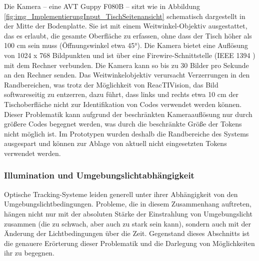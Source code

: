 Die Kamera -- eine AVT Guppy F080B \citep{AVT08}  -- sitzt wie in Abbildung \ref{fig:img_ImplementierungInput_TischSeitenansicht} schematisch dargestellt in der Mitte der Bodenplatte. Sie ist mit einem Weitwinkel-Objektiv ausgestattet, das es erlaubt, die gesamte Oberfläche zu erfassen, ohne dass der Tisch höher als 100 cm sein muss (Öffnungswinkel etwa 45°). Die Kamera bietet eine Auflösung von 1024 x 768 Bildpunkten und ist über eine Firewire-Schnittstelle (IEEE 1394 \citep{Bloks96}) mit dem Rechner verbunden. Die Kamera kann so bis zu 30 Bilder pro Sekunde an den Rechner senden. Das Weitwinkelobjektiv verursacht Verzerrungen in den Randbereichen, was trotz der Möglichkeit von ReacTIVision, das Bild softwareseitig zu entzerren, dazu führt, dass links und rechts etwa 10 cm der Tischoberfläche nicht zur Identifikation von Codes verwendet werden können. Dieser Problematik kann aufgrund der beschränkten Kameraauflösung nur durch größere Codes begegnet werden, was durch die beschränkte Größe der Tokens nicht möglich ist. Im Prototypen wurden deshalb die Randbereiche des Systems ausgespart und können zur Ablage von aktuell nicht eingesetzten Tokens verwendet werden. 

\subsubsection{Illumination und Umgebungslichtabhängigkeit} %
\label{sub:illumination_und_umgebungslichtabhängigkeit}

Optische Tracking-Systeme leiden generell unter ihrer Abhängigkeit von den Umgebungslichtbedingungen. Probleme, die in diesem Zusammenhang auftreten, hängen nicht nur mit der absoluten Stärke der Einstrahlung von Umgebungslicht zusammen (die zu schwach, aber auch zu stark sein kann), sondern auch mit der Änderung der Lichtbedingungen über die Zeit. Gegenstand dieses Abschnitts ist die genauere Erörterung dieser Problematik und die Darlegung von Möglichkeiten ihr zu begegnen.


